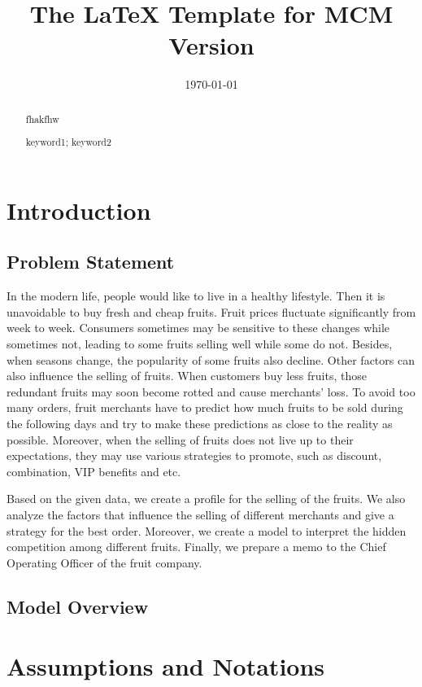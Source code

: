 \documentclass{mcmthesis}
\title{The \LaTeX{} Template for MCM Version \MCMversion}
\author{}
\date{\today}
\begin{document}
\begin{abstract}
fhakfhw
\begin{keywords}
keyword1; keyword2
\end{keywords}
\end{abstract}
\maketitle
\tableofcontents

\newpage
\section{Introduction}

\subsection{Problem Statement}
In the modern life, people would like to live in a healthy lifestyle. Then it is unavoidable to buy fresh and cheap fruits. Fruit prices fluctuate significantly from week to week. Consumers sometimes may be sensitive to these changes while sometimes not, leading to some fruits selling well while some do not. Besides, when seasons change, the popularity of some fruits also decline. Other factors can also influence the selling of fruits. When customers buy less fruits, those redundant fruits may soon become rotted and cause merchants’ loss. To avoid too many orders, fruit merchants have to predict how much fruits to be sold during the following days and try to make these predictions as close to the reality as possible. Moreover, when the selling of fruits does not live up to their expectations, they may use various strategies to promote, such as discount, combination, VIP benefits and etc. 

Based on the given data, we create a profile for the selling of the fruits. We also analyze the factors that influence the selling of different merchants and give a strategy for the best order. Moreover, we create a model to interpret the hidden competition among different fruits. Finally, we prepare a memo to the Chief Operating Officer of the fruit company.
\subsection{Model Overview}

\section{Assumptions and Notations}
\end{document}
